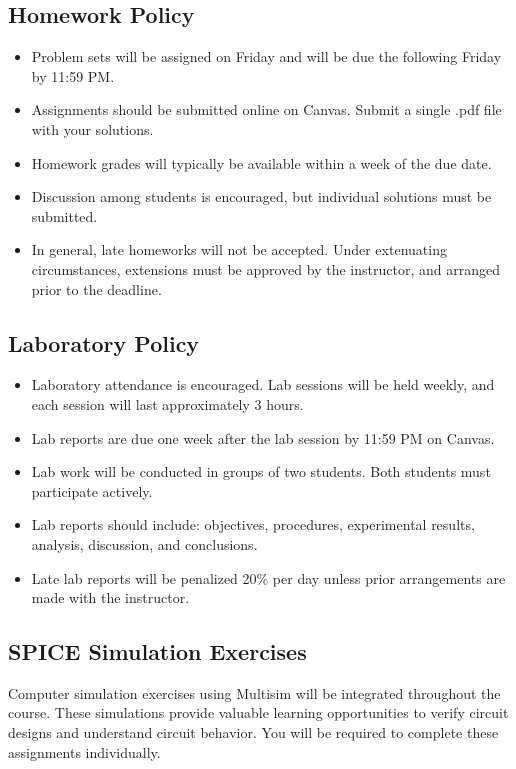 \documentclass[10pt]{article}
\begin{document}
\subsection*{Homework Policy}

\begin{itemize}
	\item Problem sets will be assigned on Friday and will be due the following Friday by 11:59 PM.
	\item Assignments should be submitted online on Canvas. Submit a single .pdf file with your solutions.  
	\item Homework grades will typically be available within a week of the due date. 
	\item Discussion among students is encouraged, but individual solutions must be submitted. 
	\item In general, late homeworks will not be accepted. Under extenuating circumstances, extensions must be approved by the instructor, and arranged prior to the deadline. 
\end{itemize}

\subsection*{Laboratory Policy}

\begin{itemize}
    \item Laboratory attendance is encouraged. Lab sessions will be held weekly, and each session will last approximately 3 hours.
    \item Lab reports are due one week after the lab session by 11:59 PM on Canvas.
    \item Lab work will be conducted in groups of two students. Both students must participate actively. 
    \item Lab reports should include: objectives, procedures, experimental results, analysis, discussion, and conclusions.
    \item Late lab reports will be penalized 20\% per day unless prior arrangements are made with the instructor.
\end{itemize}

\subsection*{SPICE Simulation Exercises}

Computer simulation exercises using Multisim will be integrated throughout the course. These simulations provide valuable learning opportunities to verify circuit designs and understand circuit behavior. You will be required to complete these assignments individually.
\end{document}
